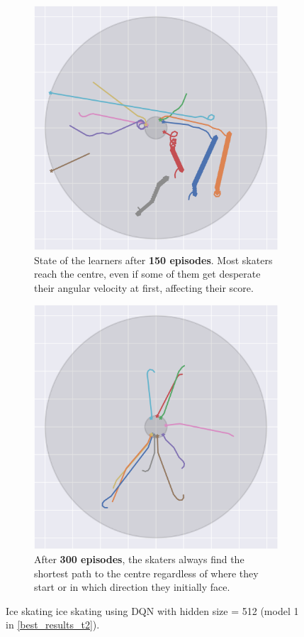 \begin{figure}[H]
\begin{subfigure}[t]{.32\textwidth}
		\includegraphics[width=\textwidth]{circle_images/image_150.png}
		\caption{State of the learners after \textbf{150 episodes}. Most skaters reach the centre, even if some of them get desperate their angular velocity at first, affecting their score.}
	\end{subfigure}\hfill{}
	\begin{subfigure}[t]{.32\textwidth}
		\includegraphics[width=\textwidth]{circle_images/image_300.png}
		\caption{After \textbf{300 episodes}, the skaters always find the shortest path to the centre regardless of where they start or in which direction they initially face.}
	\end{subfigure}
	\caption{Ice skating ice skating using DQN with hidden size = 512 (model \colorbox{id1}{1} in \cref{best_results_t2}).}
	\label{circle_plots}
\end{figure}
